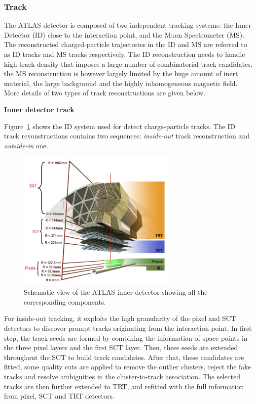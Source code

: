 \subsubsection{Track}

The ATLAS detector is composed of two independent tracking systems: the Inner Detector (ID) close to the interaction point, and the Muon Spectrometer (MS).
The reconstructed charged-particle trajectories in the ID and MS are referred to as ID tracks and MS tracks respectively.
The ID reconstruction needs to handle high track density that imposes a large number of combinatorial track candidates, 
the MS reconstruction is however largely limited by the huge amount of inert material, the large background and the highly inhomogeneous magnetic field\cite{Cornelissen:1020106}.
More details of two types of track reconstructions are given below.

\textbf{Inner detector track}

Figure~\ref{fig:track_ID} shows the ID system used for detect charge-particle tracks.
The ID track revonstructions contains two sequences: \textit{inside-out} track reconstruction and \textit{outside-in} one.
\begin{figure}[!htb]
  \centering
  \includegraphics[width=0.7\textwidth]{figures/Simulation/track_ID.png}
  \caption{Schematic view of the ATLAS inner detector showing all the corresponding components.}
  \label{fig:track_ID}
\end{figure}

For inside-out tracking, it exploits the high granularity of the pixel and SCT detectors to discover prompt tracks originating from the interaction point.
In first step, the track seeds are formed by combining the information of space-points in the three pixel layers and the first SCT layer.
Then, these seeds are extended throughout the SCT to build track candidates.
After that, these candidates are fitted, some quality cuts are applied to remove the outlier clusters, reject the fake tracks and resolve ambiguities in the cluster-to-track association.
The selected tracks are then further extended to TRT, and refitted with the full information from pixel, SCT and TRT detectors.

